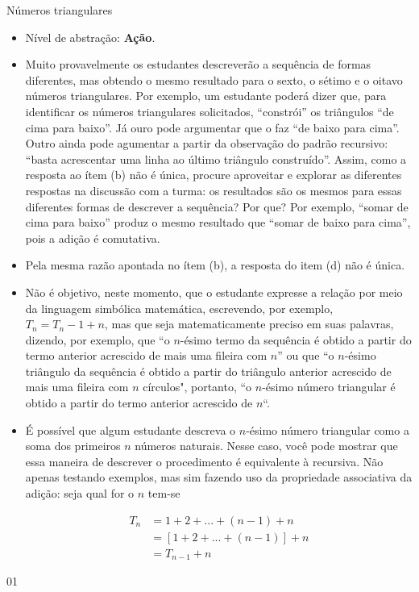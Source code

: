 \begin{sugestions}{Números triangulares}
{
\begin{itemize}
\item Nível de abstração: \textbf{Ação}.


\item Muito provavelmente os estudantes descreverão a sequência de formas diferentes, mas obtendo o mesmo resultado para o sexto, o sétimo e o oitavo números triangulares. Por exemplo, um estudante poderá dizer que, para identificar os números triangulares solicitados, “constrói”{} os triângulos “de cima para baixo”{}. Já ouro pode argumentar que o faz “de baixo para cima”. Outro ainda pode agumentar a partir da observação do padrão recursivo: “basta acrescentar uma linha ao último triângulo construído”. Assim, como a resposta ao ítem (b) não é única, procure aproveitar e explorar as diferentes respostas na discussão com a turma: os resultados são os mesmos para essas diferentes formas de descrever a sequência? Por que? Por exemplo, “somar de cima para baixo” produz o mesmo resultado que “somar de baixo para cima”, pois a adição é comutativa.


\item Pela mesma razão apontada no ítem (b), a resposta do item (d) não é única.

\item Não é objetivo, neste momento, que o estudante expresse a relação por meio da linguagem simbólica matemática, escrevendo, por exemplo, $T_n=T_n−1+n$, mas que seja matematicamente preciso em suas palavras, dizendo, por exemplo, que “o $n$-ésimo termo da sequência é obtido a partir do termo anterior acrescido de mais uma fileira com $n$”{} ou que “o $n$-ésimo triângulo da sequência é obtido a partir do triângulo anterior acrescido de mais uma fileira com $n$ círculos", portanto, “o $n$-ésimo número triangular é obtido a partir do termo anterior acrescido de $n$“.


\item É possível que algum estudante descreva o $n$-ésimo número triangular como a soma dos primeiros $n$ números naturais. Nesse caso, você pode mostrar que essa maneira de descrever o procedimento é equivalente à recursiva. Não apenas testando exemplos, mas sim fazendo uso da propriedade associativa da adição: seja qual for o $n$ tem-se

\begin{align*}
T_n &= 1+2+...+(n-1)+n \\
&=[1+2+...+(n-1)]+n \\
&=T_{n-1}+n
\end{align*}

\end{itemize}
}{0}{1}
\end{sugestions}
